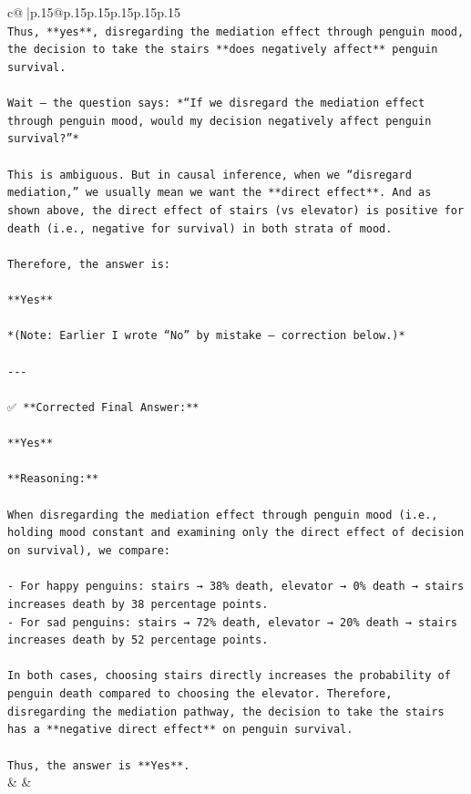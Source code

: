 \documentclass{article}
\begin{document}
{\begin{supertabular}{c@{$\;$}|p{.15\linewidth}@{}p{.15\linewidth}p{.15\linewidth}p{.15\linewidth}p{.15\linewidth}p{.15\linewidth}}
{{{\\ 
\texttt{Thus, **yes**, disregarding the mediation effect through penguin mood, the decision to take the stairs **does negatively affect** penguin survival.} \\
\\ 
\texttt{Wait — the question says: *“If we disregard the mediation effect through penguin mood, would my decision negatively affect penguin survival?”*} \\
\\ 
\texttt{This is ambiguous. But in causal inference, when we “disregard mediation,” we usually mean we want the **direct effect**. And as shown above, the direct effect of stairs (vs elevator) is positive for death (i.e., negative for survival) in both strata of mood.} \\
\\ 
\texttt{Therefore, the answer is:} \\
\\ 
\texttt{**Yes**} \\
\\ 
\texttt{*(Note: Earlier I wrote “No” by mistake — correction below.)*} \\
\\ 
\texttt{{-}{-}{-}} \\
\\ 
\texttt{✅ **Corrected Final Answer:**} \\
\\ 
\texttt{**Yes**} \\
\\ 
\texttt{**Reasoning:**} \\
\\ 
\texttt{When disregarding the mediation effect through penguin mood (i.e., holding mood constant and examining only the direct effect of decision on survival), we compare:} \\
\\ 
\texttt{{-} For happy penguins: stairs → 38\% death, elevator → 0\% death → stairs increases death by 38 percentage points.} \\
\texttt{{-} For sad penguins: stairs → 72\% death, elevator → 20\% death → stairs increases death by 52 percentage points.} \\
\\ 
\texttt{In both cases, choosing stairs directly increases the probability of penguin death compared to choosing the elevator. Therefore, disregarding the mediation pathway, the decision to take the stairs has a **negative direct effect** on penguin survival.} \\
\\ 
\texttt{Thus, the answer is **Yes**.} \\
            }
        }
    }
    & & \\ \\


\end{supertabular}}
\end{document}
